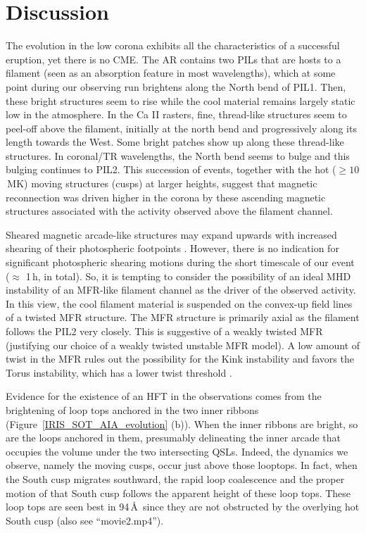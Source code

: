 \documentclass[preprint]{aastex}
\begin{document}
\section{Discussion}

The evolution in the low corona exhibits all the characteristics of a successful eruption, yet there is no CME. The AR contains two PILs that are hosts to a filament (seen as an absorption feature in most wavelengths), which at some point during our observing run brightens along the North bend of PIL1. Then, these bright structures seem to rise while the cool material remains largely static low in the atmosphere. In the Ca II rasters, fine, thread-like structures seem to peel-off above the filament, initially at the north bend and progressively along its length towards the West. Some bright patches show up along these thread-like structures. In coronal/TR wavelengths, the North bend seems to bulge and this bulging continues to PIL2. This succession of events, together with the hot ($\geq 10$\,MK) moving structures (cusps) at larger heights, suggest that magnetic reconnection was driven higher in the corona by these ascending magnetic structures associated with the activity observed above the filament channel. 

Sheared magnetic arcade-like structures may expand upwards with increased shearing of their photospheric footpoints \citep{Mikic_Linker_1994}. However, there is no indication for significant photospheric shearing motions during the short timescale of our event ($\approx$ 1\,h, in total). So, it is tempting to consider the possibility of an ideal MHD instability of an MFR-like filament channel as the driver of the observed activity. In this view, the cool filament material is suspended on the convex-up field lines of a twisted MFR structure. The MFR structure is primarily axial as the filament follows the PIL2 very closely. This is suggestive of a weakly twisted MFR (justifying our choice of a weakly twisted unstable MFR model). A low amount of twist in the MFR rules out the possibility for the Kink instability \citep{Torok_Kliem_2005} and favors the Torus instability, which has a lower twist threshold \citep{Kliem_Torok_2006}.


Evidence for the existence of an HFT in the observations comes from the brightening of loop tops anchored in the two inner ribbons (Figure~\ref{IRIS_SOT_AIA_evolution} (b)). When the inner ribbons are bright, so are the loops anchored in them, presumably delineating the inner arcade that occupies the volume under the two intersecting QSLs. Indeed, the dynamics we observe, namely the moving cusps, occur just above those looptops. In fact, when the South cusp migrates southward, the rapid loop coalescence and the proper motion of that South cusp follows the apparent height of these loop tops. These loop tops are seen best in 94\,\AA\ since they are not obstructed by the overlying hot South cusp (also see ``movie2.mp4'').
\end{document}
